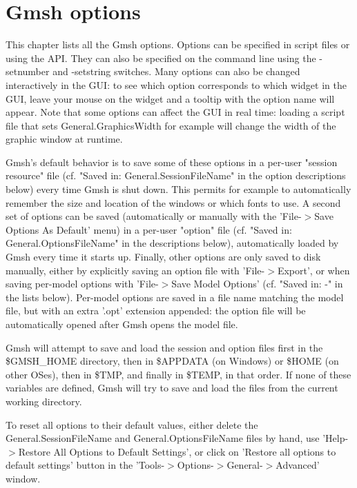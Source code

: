 \documentclass[dvipdfmx, 9pt, a4paper]{article}
\numberwithin{equation}{section}
\begin{document}
\section{Gmsh options}
This chapter lists all the Gmsh options. Options can be specified in script files or using the API. They can also be specified on the command line using the -setnumber and -setstring switches. Many options can also be changed interactively in the GUI: to see which option corresponds to which widget in the GUI, leave your mouse on the widget and a tooltip with the option name will appear. Note that some options can affect the GUI in real time: loading a script file that sets General.GraphicsWidth for example will change the width of the graphic window at runtime.\par
Gmsh's default behavior is to save some of these options in a per-user "session resource" file (cf. "Saved in: General.SessionFileName" in the option descriptions below) every time Gmsh is shut down. This permits for example to automatically remember the size and location of the windows or which fonts to use. A second set of options can be saved (automatically or manually with the 'File-$>$Save Options As Default' menu) in a per-user "option" file (cf. "Saved in: General.OptionsFileName" in the descriptions below), automatically loaded by Gmsh every time it starts up. Finally, other options are only saved to disk manually, either by explicitly saving an option file with 'File-$>$Export', or when saving per-model options with 'File-$>$Save Model Options' (cf. "Saved in: -" in the lists below). Per-model options are saved in a file name matching the model file, but with an extra '.opt' extension appended: the option file will be automatically opened after Gmsh opens the model file.\par
Gmsh will attempt to save and load the session and option files first in the \$GMSH\_HOME directory, then in \$APPDATA (on Windows) or \$HOME (on other OSes), then in \$TMP, and finally in \$TEMP, in that order. If none of these variables are defined, Gmsh will try to save and load the files from the current working directory.\par
To reset all options to their default values, either delete the General.SessionFileName and General.OptionsFileName files by hand, use 'Help-$>$Restore All Options to Default Settings', or click on 'Restore all options to default settings' button in the 'Tools-$>$Options-$>$General-$>$Advanced' window.
\end{document}
